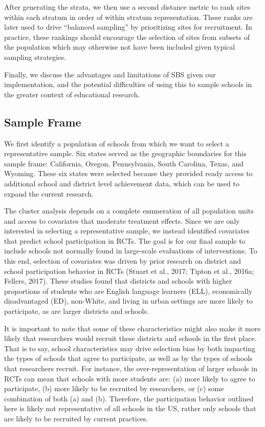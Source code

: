 \documentclass[english,man,floatsintext]{apa6}
\begin{document}
After generating the strata, we then use a second distance metric to rank sites within each stratum in order of within stratum representation. These ranks are later used to drive \enquote{balanced sampling} by prioritizing sites for recruitment. In practice, these rankings should encourage the selection of sites from subsets of the population which may otherwise not have been included given typical sampling strategies.

Finally, we discuss the advantages and limitations of SBS given our implementation, and the potential difficulties of using this to sample schools in the greater context of educational research.

\hypertarget{sample-frame}{%
\subsection{Sample Frame}\label{sample-frame}}

We first identify a population of schools from which we want to select a representative sample. Six states served as the geographic boundaries for this sample frame: California, Oregon, Pennsylvania, South Carolina, Texas, and Wyoming. These six states were selected because they provided ready access to additional school and district level achievement data, which can be used to expand the current research.

The cluster analysis depends on a complete enumeration of all population units and access to covariates that moderate treatment effects. Since we are only interested in selecting a representative sample, we instead identified covariates that predict school participation in RCTs. The goal is for our final sample to include schools not normally found in large-scale evaluations of interventions. To this end, selection of covariates was driven by prior research on district and school participation behavior in RCTs (Stuart et al., 2017; Tipton et al., 2016a; Fellers, 2017). These studies found that districts and schools with higher proportions of students who are English language learners (ELL), economically disadvantaged (ED), non-White, and living in urban settings are more likely to participate, as are larger districts and schools.

It is important to note that some of these characteristics might also make it more likely that researchers would recruit these districts and schools in the first place. That is to say, school characteristics may drive selection bias by both impacting the types of schools that agree to participate, as well as by the types of schools that researchers recruit. For instance, the over-representation of larger schools in RCTs can mean that schools with more students are: (a) more likely to agree to participate, (b) more likely to be recruited by researchers, or (c) some combination of both (a) and (b). Therefore, the participation behavior outlined here is likely not representative of all schools in the US, rather only schools that are likely to be recruited by current practices.
\end{document}
